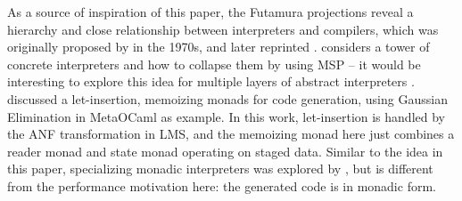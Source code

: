 As a source of inspiration of this paper, the Futamura projections
reveal a hierarchy and close relationship between interpreters and
compilers, which was originally proposed by
\citeauthor{futamura1971partial} in the 1970s\cite{futamura1971partial},
and later reprinted \cite{Futamura1999}.
\citeauthor{Amin:2017:CTI:3177123.3158140} considers a tower of
concrete interpreters and how to collapse them by using MSP -- it
would be interesting to explore this idea for multiple layers of
abstract interpreters \cite{Cousot:2019:AAI:3302515.3290355,
  Giacobazzi:2015:APA:2676726.2676987}.  \citet{10.1007/11561347_18}
discussed a let-insertion, memoizing monads for code generation, using
Gaussian Elimination in MetaOCaml as example. In this work,
let-insertion is handled by the ANF transformation in LMS, and the
memoizing monad here just combines a reader monad and state monad
operating on staged data.
Similar to the idea in this paper, specializing monadic interpreters
was explored by \citet{danvy1991compiling, DBLP:conf/dsl/SheardBP99},
but is different from the performance motivation here: the generated code
is in monadic form.
